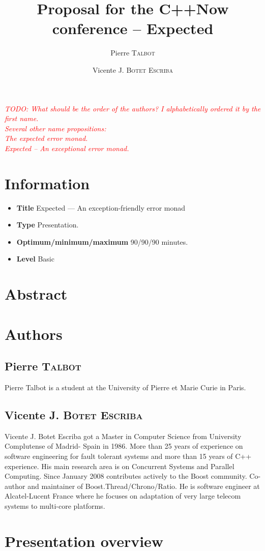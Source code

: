 \documentclass[a4paper,10pt]{article}
\title{Proposal for the C++Now conference – Expected}
\author{Pierre T\textsc{albot} \and Vicente J. B\textsc{otet} E\textsc{scriba}}
\newcommand{\todo}[1]{\emph{\textcolor{red}{TODO: #1}}}
\begin{document}
\maketitle
\todo{What should be the order of the authors? I alphabetically ordered it by the first name.\\
Several other name propositions:\\
The expected error monad.\\
Expected – An exceptional error monad.\\}
\section{Information}

\begin{itemize}
\item \textbf{Title} Expected — An exception-friendly error monad
\item \textbf{Type} Presentation.
\item \textbf{Optimum/minimum/maximum} 90/90/90 minutes.
\item \textbf{Level} Basic
\end{itemize}

\section{Abstract}



\section{Authors}

\subsection{Pierre T\textsc{albot}}

Pierre Talbot is a student at the University of Pierre et Marie Curie in Paris.

\subsection{Vicente J. B\textsc{otet} E\textsc{scriba}}

Vicente J. Botet Escriba got a Master in Computer Science from University Complutense of Madrid- Spain in 1986. More than 25 years of experience on software engineering for fault tolerant systems and more than 15 years of C++ experience. His main research area is on Concurrent Systems and Parallel Computing. Since January 2008 contributes actively to the Boost community. Co-author and maintainer of Boost.Thread/Chrono/Ratio. He is software engineer at Alcatel-Lucent France where he focuses on adaptation of very large telecom systems to multi-core platforms.

\section{Presentation overview}
\end{document}
